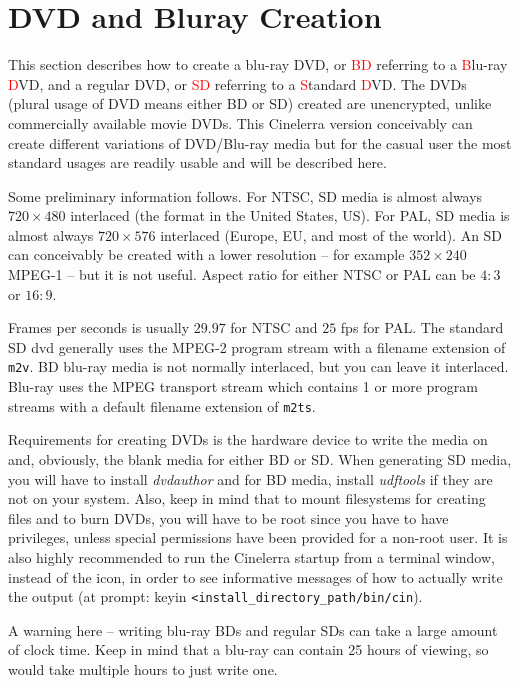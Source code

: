 \chapter{DVD and Bluray Creation}%
\label{cha:dvd_bluray_creation}

This section describes how to create a blu-ray DVD, or \textcolor{red}{BD} referring to a \textcolor{red}{B}lu-ray \textcolor{red}{D}VD, and a regular DVD, or \textcolor{red}{SD} referring to a \textcolor{red}{S}tandard \textcolor{red}{D}VD.  The DVDs (plural usage of DVD means either BD or SD) created are unencrypted, unlike commercially available movie DVDs.  This Cinelerra version conceivably can create different variations of DVD/Blu-ray media but for the casual user the most standard usages are readily usable and will be described here. 

Some preliminary information follows.  For NTSC, SD media is almost always $720\times480$ interlaced (the format in the United States, US).  For PAL, SD media is almost always $720\times576$ interlaced (Europe, EU, and most of the world).  An SD can conceivably be created with a lower resolution – for example $352\times240$ MPEG-1 -- but it is not useful.  Aspect ratio for either NTSC or PAL can be $4:3$ or $16:9$.  

Frames per seconds is usually $29.97$ for NTSC and $25$ fps for PAL.  The standard SD dvd generally uses the MPEG-2 program stream with a filename extension of \texttt{m2v}.  BD blu-ray media is not normally interlaced, but you can leave it interlaced.  Blu-ray uses the MPEG transport stream which contains 1 or more program streams with a default filename extension of \texttt{m2ts}.

Requirements for creating DVDs is the hardware device to write the media on and, obviously, the blank media for either BD or SD.  When generating SD media, you will have to install \textit{dvdauthor} and for BD media, install \textit{udftools} if they are not on your system.  Also, keep in mind that to mount filesystems for creating files and to burn DVDs, you will have to be root since you have to have privileges, unless special permissions have been provided for a non-root user.  It is also highly recommended to
run the Cinelerra startup from a terminal window, instead of the icon, in order to see informative messages of how to actually write the output (at prompt: keyin \texttt{<install\_directory\_path/bin/cin}).

A warning here -- writing blu-ray BDs and  regular SDs can take a large amount of clock time.  Keep in mind that a blu-ray can contain 25 hours of viewing, so would take multiple hours to just write one.

